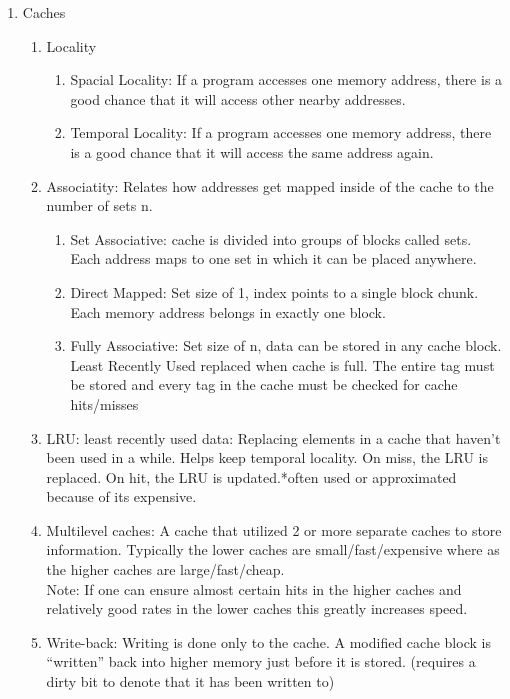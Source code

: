 \documentclass[12pt]{article}
\renewcommand{\=}[1]{\stackrel{#1}{=}} %
\theoremstyle{definition}
\theoremstyle{remark}
\begin{document}
  \begin{enumerate}

  \item Caches
    \begin{enumerate}
    \item Locality
      \begin{enumerate}
      \item Spacial Locality: If a program accesses one memory address, there is a good chance that it will access other nearby addresses.
      \item Temporal Locality: If a program accesses one memory address, there is a good chance that it will access the same address again.
      \end{enumerate}

    \item Associatity: Relates how addresses get mapped inside of
      the cache to the number of sets n.
      \begin{enumerate}
      \item Set Associative: cache is divided into groups of blocks called sets. Each address maps to one set in which it can be placed anywhere.
      \item Direct Mapped: Set size of 1, index points to a single block chunk. Each memory address belongs in exactly one block.
      \item Fully Associative: Set size of n, data can be stored in any cache block. Least Recently Used replaced when cache is full. The entire tag must be stored and every tag in the cache must be checked for cache hits/misses
      \end{enumerate}
      
      \item LRU: least recently used data: Replacing elements in a cache that haven’t been used in a while. Helps keep temporal locality. On miss, the LRU is replaced. On hit, the LRU is updated.*often used or approximated
        because of its expensive.

      \item Multilevel caches: A cache that utilized 2 or more separate
      caches to store information. Typically the lower caches are
      small/fast/expensive where as the higher caches are
      large/fast/cheap.\\
      Note: If one can ensure almost certain hits in the higher caches
      and relatively good rates in the lower caches this greatly
      increases speed.

    \item Write-back: Writing is done only to the cache. A modified
      cache block is ``written'' back into higher memory just before
      it is stored. (requires a dirty bit to denote that it has been
      written to)


\end{enumerate}
\end{enumerate}
\end{document}
